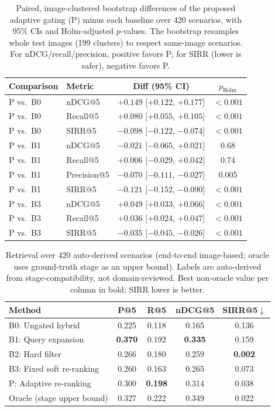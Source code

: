 \documentclass{llncs}
\begin{document}
\begin{table}[t]
\centering
\caption{Paired, image-clustered bootstrap differences of the proposed adaptive gating (P) minus each baseline over 420 scenarios, with 95\% CIs and Holm-adjusted $p$-values. The bootstrap resamples whole test images (199 clusters) to respect same-image scenarios. For nDCG/recall/precision, positive favors P; for SIRR (lower is safer), negative favors P.}
\label{tab:retrsig}
\small
\begin{tabular}{llcc}
\toprule
\textbf{Comparison} & \textbf{Metric} & \textbf{Diff (95\% CI)} & \textbf{$p_{\text{Holm}}$} \\
\midrule
P vs.\ B0 & nDCG@5 & $+0.149$ [$+0.122$, $+0.177$] & $<0.001$ \\
P vs.\ B0 & Recall@5 & $+0.080$ [$+0.055$, $+0.105$] & $<0.001$ \\
P vs.\ B0 & SIRR@5 & $-0.098$ [$-0.122$, $-0.074$] & $<0.001$ \\
\addlinespace
P vs.\ B1 & nDCG@5 & $-0.021$ [$-0.065$, $+0.021$] & 0.68 \\
P vs.\ B1 & Recall@5 & $+0.006$ [$-0.029$, $+0.042$] & 0.74 \\
P vs.\ B1 & Precision@5 & $-0.070$ [$-0.111$, $-0.027$] & 0.005 \\
P vs.\ B1 & SIRR@5 & $-0.121$ [$-0.152$, $-0.090$] & $<0.001$ \\
\addlinespace
P vs.\ B3 & nDCG@5 & $+0.049$ [$+0.033$, $+0.066$] & $<0.001$ \\
P vs.\ B3 & Recall@5 & $+0.036$ [$+0.024$, $+0.047$] & $<0.001$ \\
P vs.\ B3 & SIRR@5 & $-0.035$ [$-0.045$, $-0.026$] & $<0.001$ \\
\bottomrule
\end{tabular}
\end{table}

\begin{table}[t]
\centering
\caption{Retrieval over 420 auto-derived scenarios (end-to-end image-based; oracle uses ground-truth stage as an upper bound). Labels are auto-derived from stage-compatibility, not domain-reviewed. Best non-oracle value per column in bold; SIRR lower is better.}
\label{tab:retrieval}
\small
\begin{tabular}{lcccc}
\toprule
\textbf{Method} & \textbf{P@5} & \textbf{R@5} & \textbf{nDCG@5} & \textbf{SIRR@5}$\downarrow$ \\
\midrule
B0: Ungated hybrid & 0.225 & 0.118 & 0.165 & 0.136 \\
B1: Query expansion & \textbf{0.370} & 0.192 & \textbf{0.335} & 0.159 \\
B2: Hard filter & 0.266 & 0.180 & 0.259 & \textbf{0.002} \\
B3: Fixed soft re-ranking & 0.260 & 0.163 & 0.265 & 0.073 \\
P: Adaptive re-ranking & 0.300 & \textbf{0.198} & 0.314 & 0.038 \\
\midrule
Oracle (stage upper bound) & 0.327 & 0.222 & 0.349 & 0.022 \\
\bottomrule
\end{tabular}
\end{table}
\end{document}
